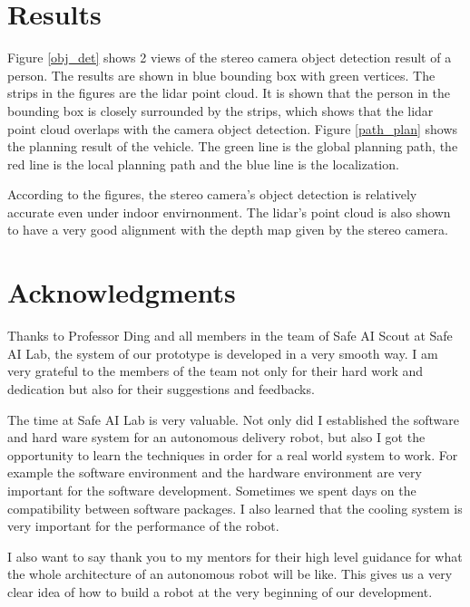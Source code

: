\documentclass[balance,upint,subscriptcorrection,varvw,nofoot, mathalfa=cal=boondoxo,spanish,french,vietnamese,russian,greek,pdf-a,fontspec,colorlinks]{asmeconf}
\begin{document}
\section{Results}

Figure \ref{obj_det} shows 2 views of the stereo camera object detection result of a person. The results are shown in blue bounding box with green vertices. The strips in the figures are the lidar point cloud. It is shown that the person in the bounding box is closely surrounded by the strips, which shows that the lidar point cloud overlaps with the camera object detection. Figure \ref{path_plan} shows the planning result of the vehicle. The green line is the global planning path, the red line is the local planning path and the blue line is the localization.

According to the figures, the stereo camera’s object detection is relatively accurate even under indoor
envirnonment. The lidar’s point cloud is also shown to have a very good alignment with the depth map given by
the stereo camera.



\section*{Acknowledgments}

Thanks to Professor Ding and all members in the team of Safe AI Scout at Safe AI Lab, the system of our prototype is developed in a very smooth way. I am very grateful to the members of the team not only for their hard work and dedication but also for their suggestions and feedbacks. 

The time at Safe AI Lab is very valuable. Not only did I established the software and hard ware system for an autonomous delivery robot, but also I got the opportunity to learn the techniques in order for a real world system to work. For example the software environment and the hardware environment are very important for the software development. Sometimes we spent days on the compatibility between software packages. I also learned that the cooling system is very important for the performance of the robot.

I also want to say thank you to my mentors for their high level guidance for what the whole architecture of an autonomous robot will be like. This gives us a very clear idea of how to build a robot at the very beginning of our development. 
\end{document}
